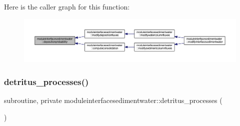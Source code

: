 Here is the caller graph for this function\+:\nopagebreak
\begin{figure}[H]
\begin{center}
\leavevmode
\includegraphics[width=350pt]{namespacemoduleinterfacesedimentwater_a0e44cb6bef52ac05cfb4ad24e8715a5d_icgraph}
\end{center}
\end{figure}
\mbox{\label{namespacemoduleinterfacesedimentwater_a2327d7638eb1058aa8b3f9f188eda1c9}} 
\subsubsection{\texorpdfstring{detritus\+\_\+processes()}{detritus\_processes()}}
{\footnotesize\ttfamily subroutine, private moduleinterfacesedimentwater\+::detritus\+\_\+processes (\begin{DoxyParamCaption}{ }\end{DoxyParamCaption})\hspace{0.3cm}{\ttfamily [private]}}


